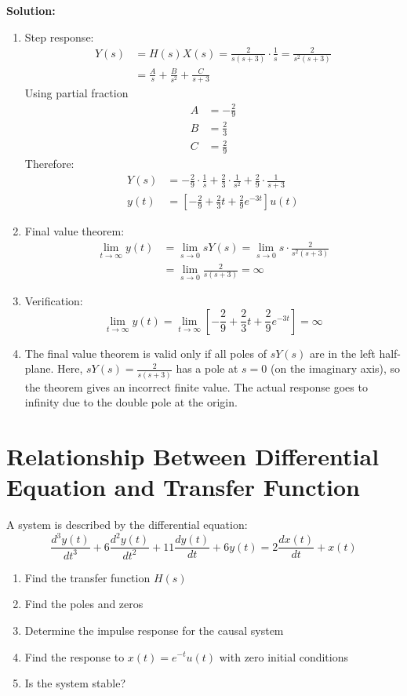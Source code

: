 \documentclass{article}
\begin{document}
\textbf{Solution:}
\begin{enumerate}[label=(\alph*)]
    \item Step response:
    \begin{align*}
        Y(s) &= H(s)X(s) = \frac{2}{s(s + 3)} \cdot \frac{1}{s} = \frac{2}{s^2(s + 3)} \\
        &= \frac{A}{s} + \frac{B}{s^2} + \frac{C}{s + 3}
    \end{align*}
    Using partial fraction
    \begin{align*}
        A & = -\frac{2}{9}\\
        B & = \frac{2}{3}\\
        C & = \frac{2}{9}
    \end{align*}
    Therefore:
    \begin{align*}
        Y(s) &= -\frac{2}{9} \cdot \frac{1}{s} + \frac{2}{3} \cdot \frac{1}{s^2} + \frac{2}{9} \cdot \frac{1}{s + 3} \\
        y(t) &= \left[-\frac{2}{9} + \frac{2}{3}t + \frac{2}{9}e^{-3t}\right]u(t)
    \end{align*}
    
    \item Final value theorem:
    \begin{align*}
        \lim_{t\to\infty} y(t) &= \lim_{s\to 0} sY(s) = \lim_{s\to 0} s \cdot \frac{2}{s^2(s + 3)} \\
        &= \lim_{s\to 0} \frac{2}{s(s + 3)} = \infty
    \end{align*}
    
    \item Verification:
    \[ \lim_{t\to\infty} y(t) = \lim_{t\to\infty} \left[-\frac{2}{9} + \frac{2}{3}t + \frac{2}{9}e^{-3t}\right] = \infty \]
    
    \item The final value theorem is valid only if all poles of $sY(s)$ are in the left half-plane. Here, $sY(s) = \frac{2}{s(s + 3)}$ has a pole at $s = 0$ (on the imaginary axis), so the theorem gives an incorrect finite value. The actual response goes to infinity due to the double pole at the origin.
\end{enumerate}

\section{Relationship Between Differential Equation and Transfer Function}
A system is described by the differential equation:
\[ \frac{d^3y(t)}{dt^3} + 6\frac{d^2y(t)}{dt^2} + 11\frac{dy(t)}{dt} + 6y(t) = 2\frac{dx(t)}{dt} + x(t) \]
\begin{enumerate}[label=(\alph*)]
    \item Find the transfer function $H(s)$
    \item Find the poles and zeros
    \item Determine the impulse response for the causal system
    \item Find the response to $x(t) = e^{-t}u(t)$ with zero initial conditions
    \item Is the system stable?
\end{enumerate}
\end{document}
